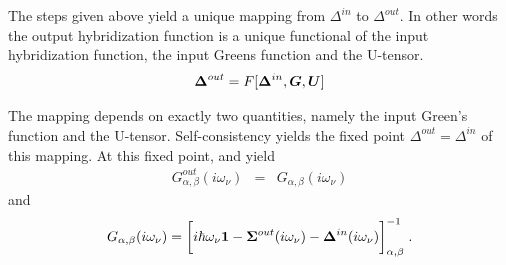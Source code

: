 \documentclass[11pt,a4paper]{report}
\begin{document}
The steps given above yield a unique mapping from $\Delta^{in}$ to
$\Delta^{out}$. In other words the output hybridization function is a
unique functional of the input hybridization function, the input
Greens function and the U-tensor.
\begin{eqnarray}
\bm{\Delta}^{out}=F[\bm{\Delta}^{in},\bm{G},\bm{U}]
\end{eqnarray}


The mapping depends on exactly two quantities, namely
the input Green's function and the U-tensor. Self-consistency yields the 
fixed point $\Delta^{out}=\Delta^{in}$ of this mapping.
At this fixed point,  and  yield
\begin{eqnarray}
G^{out}_{\alpha,\beta}(i\omega_\nu)&=&G_{\alpha,\beta}(i\omega_\nu)
\end{eqnarray}
and 
\begin{eqnarray}
G_{\alpha,\beta}(i\omega_\nu)
=\biggl[
i\hbar\omega_\nu\bm{1}
-\bm{\Sigma}^{out}(i\omega_\nu)
-\bm{\Delta}^{in}(i\omega_\nu)
\biggr]^{-1}_{\alpha,\beta}
\;.
\end{eqnarray}


\printindex
\clearpage
 
 
\end{document}
